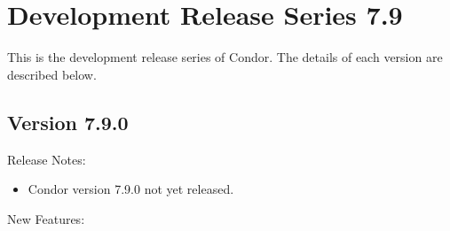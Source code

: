 
\section{\label{sec:History-7-9}Development Release Series 7.9}

This is the development release series of Condor.
The details of each version are described below.

\subsection*{\label{sec:New-7-9-0}Version 7.9.0}

\noindent Release Notes:

\begin{itemize}

\item Condor version 7.9.0 not yet released.

\end{itemize}


\noindent New Features:

